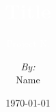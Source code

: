 \documentclass{beamer}
\title{\textcolor{white}{\bf Title}}
\subtitle{\textcolor{white}{\tiny \transparent{0.7} Project N. }}
\author{{\it \tiny \transparent{0.7} By:}\\ Name}
\date{{\tiny \today}}
\institute{{\it \tiny \transparent{0.7} Supervisor:}\\ \tiny Dr. Name}
\begin{document}
    \begin{frame}[plain,t]
        \titlepage
    \end{frame}

    
    
    
    
    
    


    
    \ThankYouFrame
\end{document}
